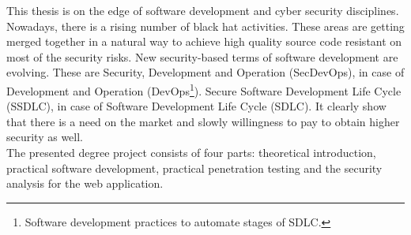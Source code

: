 \documentclass{article} %
\begin{document}
\newline
This thesis is on the edge of software development and cyber security disciplines. Nowadays, there is a rising number of black hat activities. These areas are getting merged together in a natural way to achieve high quality source code resistant on most of the security risks. New security-based terms of software development are evolving. These are Security, Development and Operation (SecDevOps), in case of Development and Operation (DevOps\footnote{Software development practices to automate stages of SDLC.}). Secure Software Development Life Cycle (SSDLC), in case of Software Development Life Cycle (SDLC). It clearly show that there is a need on the market and slowly willingness to pay to obtain higher security as well.\\
\newline
The presented degree project consists of four parts: theoretical introduction, practical software development, practical penetration testing and the security analysis for the web application. 
\end{document}
